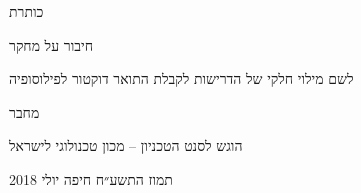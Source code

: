 \begin{hebrew}
\begin{center}

{\Huge כותרת}


{\Large חיבור על מחקר}


\parbox{30em}{
\begin{center}
לשם מילוי חלקי של הדרישות לקבלת התואר
דוקטור לפילוסופיה
\end{center}
}


{\huge מחבר}


הוגש לסנט הטכניון – מכון טכנולוגי לישראל

תמוז התשע״ח חיפה יולי 2018
\end{center}
\end{hebrew}